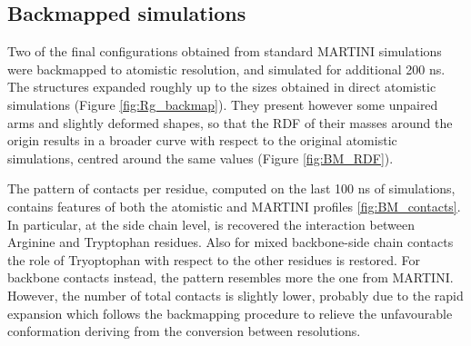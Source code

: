\subsection{Backmapped simulations} 

Two of the final configurations obtained from standard MARTINI simulations were backmapped to atomistic resolution, and simulated for additional 200 ns. The structures expanded roughly up to the sizes obtained in direct atomistic simulations (Figure \ref{fig:Rg_backmap}). They present however some unpaired arms and slightly deformed shapes, so that the RDF of their masses around the origin results in a broader curve with respect to the original atomistic simulations, centred around the same values (Figure \ref{fig:BM_RDF}).

The pattern of contacts per residue, computed on the last 100 ns of simulations, contains features of both the atomistic and MARTINI profiles \ref{fig:BM_contacts}.
%
In particular, at the side chain level, is recovered the interaction between Arginine and Tryptophan residues. Also for mixed backbone-side chain contacts the role of Tryoptophan with respect to the other residues is restored. For backbone contacts instead, the pattern resembles more the one from MARTINI. However, the number of total contacts is slightly lower, probably due to the rapid expansion which follows the backmapping procedure to relieve the unfavourable conformation deriving from the conversion between resolutions.
%
